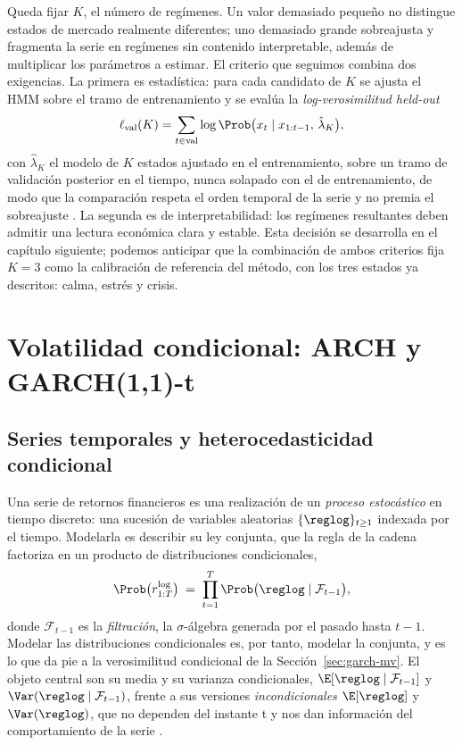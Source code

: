 Queda fijar $K$, el número de regímenes. Un valor demasiado pequeño no distingue estados de mercado realmente diferentes; uno demasiado grande sobreajusta y fragmenta la serie en regímenes sin contenido interpretable, además de multiplicar los parámetros a estimar. El criterio que seguimos combina dos exigencias. La primera es estadística: para cada candidato de $K$ se ajusta el HMM sobre el tramo de entrenamiento y se evalúa la \emph{log-verosimilitud held-out}
\[
\ell_{\mathrm{val}}(K) = \sum_{t \in \mathrm{val}} \log \Prob\big(x_t \mid x_{1:t-1},\, \hat{\lambda}_K\big),
\]
con $\hat{\lambda}_K$ el modelo de $K$ estados ajustado en el entrenamiento, sobre un tramo de validación posterior en el tiempo, nunca solapado con el de entrenamiento, de modo que la comparación respeta el orden temporal de la serie y no premia el sobreajuste \cite{rabiner1989}. La segunda es de interpretabilidad: los regímenes resultantes deben admitir una lectura económica clara y estable. Esta decisión se desarrolla en el capítulo siguiente; podemos anticipar que la combinación de ambos criterios fija $K = 3$ como la calibración de referencia del método, con los tres estados ya descritos: calma, estrés y crisis.

\section{Volatilidad condicional: ARCH y GARCH(1,1)-t}
\label{sec:garch}

\subsection{Series temporales y heterocedasticidad condicional}
\label{sec:garch-intro}

Una serie de retornos financieros es una realización de un \emph{proceso estocástico} en tiempo discreto: una sucesión de variables aleatorias $\{\reglog\}_{t \ge 1}$ indexada por el tiempo. Modelarla es describir su ley conjunta, que la regla de la cadena factoriza en un producto de distribuciones condicionales,
\[
\Prob\big(r^{\log}_{1:T}\big) \;=\; \prod_{t=1}^{T} \Prob\big(\reglog \mid \mathcal{F}_{t-1}\big),
\]
donde $\mathcal{F}_{t-1}$ es la \emph{filtración}, la $\sigma$-álgebra generada por el pasado hasta $t-1$. Modelar las distribuciones condicionales es, por tanto, modelar la conjunta, y es lo que da pie a la verosimilitud condicional de la Sección~\ref{sec:garch-mv}. El objeto central son su media y su varianza condicionales, $\E[\reglog \mid \mathcal{F}_{t-1}]$ y $\Var(\reglog \mid \mathcal{F}_{t-1})$, frente a sus versiones \emph{incondicionales} $\E[\reglog]$ y $\Var(\reglog)$, que no dependen del instante t y nos dan información del comportamiento de la serie \cite{hamilton1994, tsay2010}.

